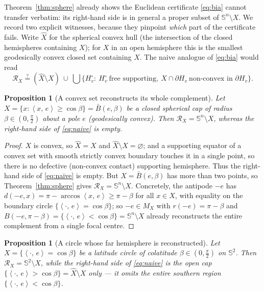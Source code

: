 \documentclass[11pt]{article}
\newtheorem{proposition}[theorem]{Proposition}
\theoremstyle{remark}
\newcommand{\X}{X}
\newcommand{\Xhat}{\widehat{\X}}
\newcommand{\Mx}{M_{\X}}
\newcommand{\Rx}{\mathcal{R}_{\X}}
\newcommand{\sca}[2]{\left\langle #1,\, #2\right\rangle}
\newcommand{\Sn}{\mathbb{S}^{n}}
\begin{document}
Theorem~\ref{thm:sphere} already shows the Euclidean certificate
\eqref{eq:bia} cannot transfer verbatim: its right-hand side is in general
a proper subset of $\Sn\setminus\X$. We record two explicit witnesses,
because they pinpoint \emph{which} part of the certificate fails. Write
$\Xhat$ for the spherical convex hull (the intersection of the closed
hemispheres containing $\X$); for $\X$ in an open hemisphere this is the
smallest geodesically convex closed set containing $\X$. The naive
analogue of \eqref{eq:bia} would read
\begin{equation}\label{eq:naive}
  \Rx\overset{?}{=}(\Xhat\setminus\X)\ \cup\
  \bigcup\bigl\{H_{v}^{\circ}:\ H_{v}^{\circ}\ \text{free supporting},\
  \X\cap\partial H_{v}\ \text{non-convex in }\partial H_{v}\bigr\}.
\end{equation}

\begin{proposition}[A convex set reconstructs its whole complement]
\label{prop:cap}
Let $\X=\{x:\sca{x}{e}\ge\cos\beta\}=\bar B(e,\beta)$ be a closed
spherical cap of radius $\beta\in(0,\tfrac\pi2)$ about a pole $e$
(geodesically convex). Then $\Rx=\Sn\setminus\X$, whereas the right-hand
side of \eqref{eq:naive} is empty.
\end{proposition}

\begin{proof}
$\X$ is convex, so $\Xhat=\X$ and $\Xhat\setminus\X=\varnothing$; and a
supporting equator of a convex set with smooth strictly convex boundary
touches it in a single point, so there is no defective (non-convex
contact) supporting hemisphere. Thus the right-hand side of
\eqref{eq:naive} is empty. But $\X=\bar B(e,\beta)$ has more than two
points, so Theorem~\ref{thm:sphere} gives $\Rx=\Sn\setminus\X$.
Concretely, the antipode $-e$ has
$d(-e,x)=\pi-\arccos\sca{x}{e}\ge\pi-\beta$ for all $x\in\X$, with equality
on the boundary circle $\{\sca{\cdot}{e}=\cos\beta\}$; so $-e\in\Mx$ with
$r(-e)=\pi-\beta$ and $B(-e,\pi-\beta)=\{\sca{\cdot}{e}<\cos\beta\}=
\Sn\setminus\X$ already reconstructs the entire complement from a single
focal centre.
\end{proof}

\begin{proposition}[A circle whose far hemisphere is reconstructed]
\label{prop:circle}
Let $\X=\{\sca{\cdot}{e}=\cos\beta\}$ be a latitude circle of colatitude
$\beta\in(0,\tfrac\pi2)$ on $\mathbb{S}^{2}$. Then $\Rx=\mathbb{S}^{2}
\setminus\X$, while the right-hand side of \eqref{eq:naive} is the open
cap $\{\sca{\cdot}{e}>\cos\beta\}=\Xhat\setminus\X$ only --- it omits the
entire southern region $\{\sca{\cdot}{e}<\cos\beta\}$.
\end{proposition}
\end{document}
